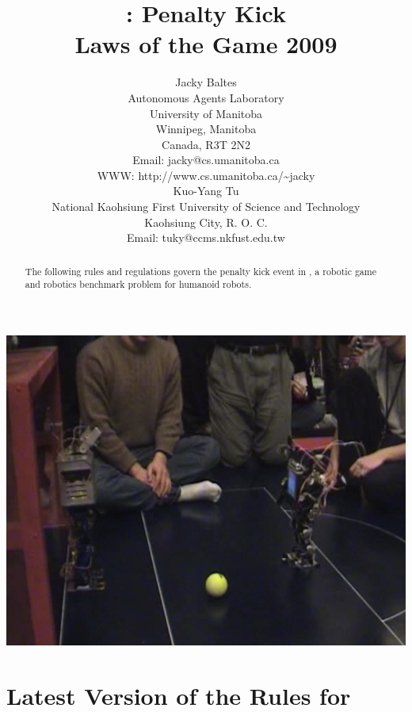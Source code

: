 \documentclass[12pt]{hurocup}
\begin{document}
\title{\HuroCup: Penalty Kick\\
  Laws of the Game 2009}


\author{Jacky Baltes\\
Autonomous Agents Laboratory\\
University of Manitoba\\
Winnipeg, Manitoba\\
Canada, R3T 2N2\\
Email: jacky@cs.umanitoba.ca\\
WWW: http://www.cs.umanitoba.ca/\~{ }jacky\\[5mm]
Kuo-Yang Tu\\
National Kaohsiung First University of Science and Technology\\
Kaohsiung City, R. O. C.\\
Email: tuky@ccms.nkfust.edu.tw\\
}

\maketitle

\begin{center}
 \includegraphics[width=0.7\linewidth]{Figures/penalty-kick-life}
\end{center}

\begin{abstract}
The following rules and regulations govern the penalty kick event in
\HuroCup, a robotic game and robotics benchmark problem for humanoid
robots.
%
\end{abstract}

\section*{Latest Version of the Rules for \HuroCup}
\label{sec:updates}
\end{document}
